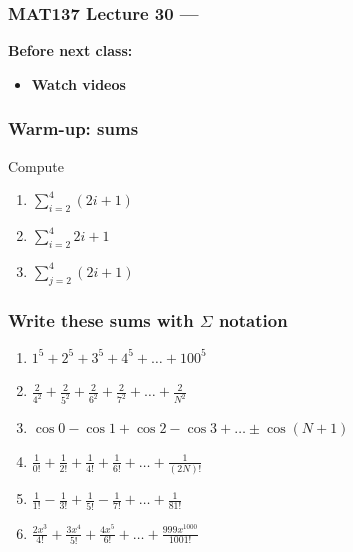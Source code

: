 \documentclass[14pt]{beamer}
\date{}
\title{}
\author{}
\newcommand{\setsize}[1]{\fontsize{#1}{#1}\selectfont} %
\newcommand{\smallerfont}{\setsize{13}} %
\begin{document}
\begin{frame}
	\frametitle{MAT137 Lecture 30 --- }

	\vfill
	{\bf Before next class:}
		\begin{itemize} \normalsize
			\item {\bf Watch videos}
		\end{itemize}
\end{frame}

	\begin{frame}[t]
		\frametitle{Warm-up: sums}

		Compute

		\begin{enumerate}
			\item ${\displaystyle \sum_{i=2}^{4} (2i+1)}$
				\vfill

			\item ${\displaystyle \sum_{i=2}^4 2i + 1}$
				\vfill

			\item ${\displaystyle \sum_{j=2}^4 (2i + 1)}$
				\vfill
		\end{enumerate}
	\end{frame}
	\begin{frame}[t]
		\smallerfont
		\frametitle{Write these sums with $\Sigma$ notation}

		\begin{enumerate}
			\item ${\displaystyle 1^5 + 2^5 + 3^5 + 4^5 + \ldots + 100^5}$
				\vfill

			\item ${\displaystyle \frac{2}{4^{2}} + \frac{2}{5^{2}} + \frac{2}{6^{2}} + \frac{2}{7^{2}} + \ldots + \frac{2}{N^{2}}}$
				\vfill

			\item ${\displaystyle \cos 0 - \cos 1 + \cos 2 - \cos 3 + %
				\ldots \pm \cos (N+1)}$
				\vfill

			\item ${\displaystyle \frac{1}{0!} + \frac{1}{2!} + \frac{1}{4!} + \frac{1}{6!} + \ldots + \frac{1}{(2N)!}}$
				\vfill

			\item ${\displaystyle \frac{1}{1!} - \frac{1}{3!} + \frac{1}{5!} - \frac{1}{7!} + \ldots + \frac{1}{81!}}$
				\vfill

			\item ${\displaystyle  \frac{2x^{3}}{ 4!} + \frac{3x^{4}}{5!} + \frac{4x^{5}}{6!} + \ldots + \frac{999x^{1000}}{1001!}}$
		\end{enumerate}
	\end{frame}
\end{document}
